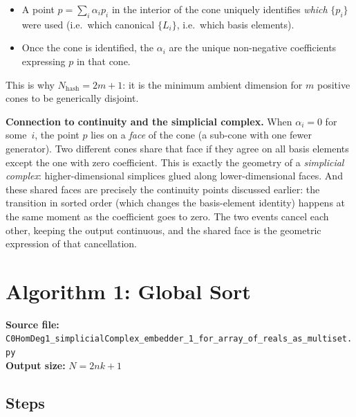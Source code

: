 \documentclass[11pt,a4paper]{article}
\begin{document}
\begin{itemize}[nosep]
  \item A point $p = \sum_i \alpha_i p_i$ in the interior of the cone
        uniquely identifies \emph{which} $\{p_i\}$ were used (i.e.\ which
        canonical $\{L_i\}$, i.e.\ which basis elements).
  \item Once the cone is identified, the $\alpha_i$ are the unique
        non-negative coefficients expressing $p$ in that cone.
\end{itemize}

\noindent
This is why $N_{\text{hash}} = 2m+1$: it is the minimum ambient dimension
for $m$ positive cones to be generically disjoint.

\textbf{Connection to continuity and the simplicial complex.}
When $\alpha_i = 0$ for some~$i$, the point $p$ lies on a \emph{face} of
the cone (a sub-cone with one fewer generator).  Two different cones share
that face if they agree on all basis elements except the one with zero
coefficient.  This is exactly the geometry of a \emph{simplicial complex}:
higher-dimensional simplices glued along lower-dimensional faces.  And these
shared faces are precisely the continuity points discussed earlier: the
transition in sorted order (which changes the basis-element identity) happens
at the same moment as the coefficient goes to zero.  The two events cancel
each other, keeping the output continuous, and the shared face is the
geometric expression of that cancellation.


\section{Algorithm 1: Global Sort}
\label{sec:alg1}

\textcolor{alg1}{\textbf{Source file:}}
\texttt{C0HomDeg1\_simplicialComplex\_embedder\_1\_for\_array\_of\_reals\_as\_multiset.py}\\
\textbf{Output size:} $N = 2nk + 1$

\subsection*{Steps}
\end{document}
